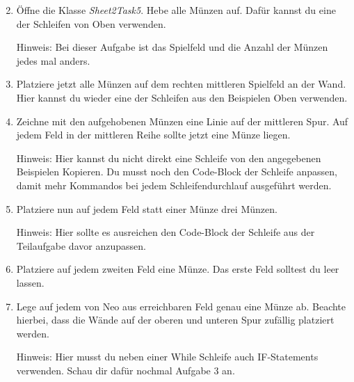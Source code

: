 \begin{enumerate} \setcounter{enumi}{1}
    \item Öffne die Klasse \textit{Sheet2Task5}. 
        Hebe alle Münzen auf.
        Dafür kannst du eine der Schleifen von Oben verwenden.

        Hinweis: Bei dieser Aufgabe ist das Spielfeld und die Anzahl der Münzen jedes mal anders.
    \item Platziere jetzt alle Münzen auf dem rechten mittleren Spielfeld an der Wand. 
        Hier kannst du wieder eine der Schleifen aus den Beispielen Oben verwenden.
    \item Zeichne mit den aufgehobenen Münzen eine Linie auf der mittleren Spur. 
        Auf jedem Feld in der mittleren Reihe sollte jetzt eine Münze liegen.

        Hinweis: Hier kannst du nicht direkt eine Schleife von den angegebenen Beispielen Kopieren.
        Du musst noch den Code-Block der Schleife anpassen, damit mehr Kommandos bei jedem Schleifendurchlauf ausgeführt werden.
    \item Platziere nun auf jedem Feld statt einer Münze drei Münzen.
    
        Hinweis: Hier sollte es ausreichen den Code-Block der Schleife aus der Teilaufgabe davor anzupassen.
    \item Platziere auf jedem zweiten Feld eine Münze.
        Das erste Feld solltest du leer lassen.
    \item \optional Lege auf jedem von Neo aus erreichbaren Feld genau eine Münze ab. 
        Beachte hierbei, dass die Wände auf der oberen und unteren Spur zufällig platziert werden.

        Hinweis: Hier musst du neben einer While Schleife auch IF-Statements verwenden.
            Schau dir dafür nochmal Aufgabe 3 an.
\end{enumerate}
